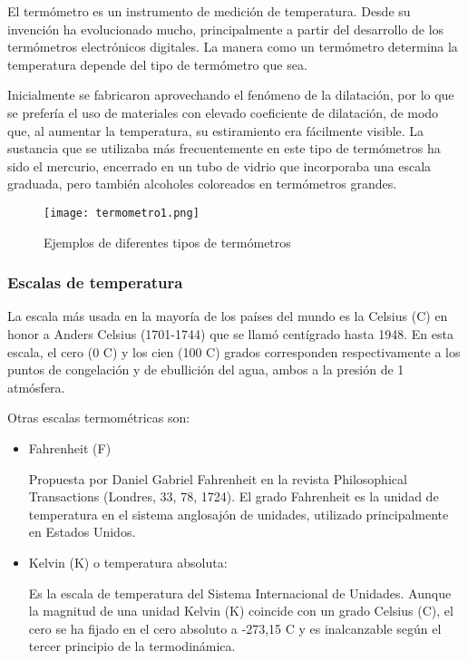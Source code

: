 \par 
El termómetro es un instrumento de medición de temperatura. Desde su invención ha evolucionado mucho, principalmente a partir del desarrollo de los termómetros electrónicos digitales. La manera como un termómetro determina la temperatura depende del tipo de termómetro que sea\cite{termometro}. 

\par \noindent
Inicialmente se fabricaron aprovechando el fenómeno de la dilatación, por lo que se prefería el uso de materiales con elevado coeficiente de dilatación, de modo que, al aumentar la temperatura, su estiramiento era fácilmente visible. La sustancia que se utilizaba más frecuentemente en este tipo de termómetros ha sido el mercurio, encerrado en un tubo de vidrio que incorporaba una escala graduada, pero también alcoholes coloreados en termómetros grandes\cite{termometro}.

\begin{figure}[H]
	\centering
	\texttt{[image: termometro1.png]}
	\caption{Ejemplos de diferentes tipos de termómetros}
\end{figure}

\subsubsection{Escalas de temperatura}

\par 
La escala más usada en la mayoría de los países del mundo es la Celsius (\textdegree{}C) en honor a Anders Celsius (1701-1744) que se llamó centígrado hasta 1948. En esta escala, el cero (0 \textdegree{}C) y los cien (100 \textdegree{}C) grados corresponden respectivamente a los puntos de congelación y de ebullición del agua, ambos a la presión de 1 atmósfera.\cite{termometro}

\par \noindent 
Otras escalas termométricas son:\cite{termometro}

\begin{itemize}
	
	\item Fahrenheit (\textdegree{}F) 
	
	Propuesta por Daniel Gabriel Fahrenheit en la revista Philosophical Transactions (Londres, 33, 78, 1724). El grado Fahrenheit es la unidad de temperatura en el sistema anglosajón de unidades, utilizado principalmente en Estados Unidos.
	
	\item Kelvin (K) o temperatura absoluta: 
	
	Es la escala de temperatura del Sistema Internacional de Unidades. Aunque la magnitud de una unidad Kelvin (K) coincide con un grado Celsius (\textdegree{}C), el cero se ha fijado en el cero absoluto a -273,15 \textdegree{}C y es inalcanzable según el tercer principio de la termodinámica.
\end{itemize}

